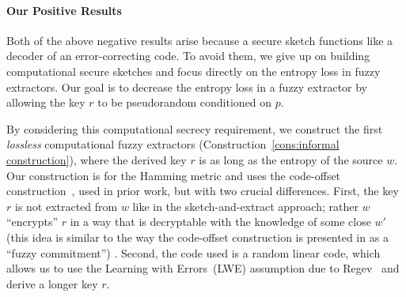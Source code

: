 \documentclass[11pt]{article}
\newcommand{\consref}[1]{\mbox{Construction~\ref{#1}}}
\newcommand{\class}[1]{{\ensuremath{\mathsf{#1}}}}
\newcommand{\rep}{\ensuremath{\class{Rep}}\xspace}
\newcommand{\rec}{\ensuremath{\class{Rec}}\xspace}
\newcommand{\authnote}[2]{{\textcolor{red}{\textsf{#1 notes: }\textcolor{blue}{ #2}}\marginpar{\textcolor{red}{\textbf{!!!!!}}}}}
\newcommand{\authnote}[2]{}
\newcommand{\lnote}[1]{{\authnote{Leo}{#1}}}
\newcommand{\recout}{x}
\begin{document}





\paragraph {Our Positive Results}

Both of the above negative results arise because a secure sketch functions like a decoder of an error-correcting code.  To avoid them, we give up on building computational secure sketches and focus directly on the entropy loss in fuzzy extractors.  Our goal is to decrease the entropy loss in a fuzzy extractor by allowing the key $r$ to be pseudorandom conditioned on $p$.  

By considering this computational secrecy requirement, we construct the first \emph{lossless} computational fuzzy extractors (\consref{cons:informal construction}), where the derived key $r$ is as long as the entropy of the source $w$. Our construction is for the Hamming metric and uses the code-offset construction~\cite{JW99},\cite[Section 5]{DBLP:journals/siamcomp/DodisORS08} used in prior work, but with two crucial differences.  First, the key $r$ is not extracted from $w$ like in the sketch-and-extract approach; rather $w$ ``encrypts'' $r$ in a way that is decryptable with the knowledge of some close $w'$ (this idea is similar to the way the code-offset construction is presented in 
\cite{JW99} as  a ``fuzzy commitment'') . Second, the code used is a random linear code, which allows us to use the Learning with Errors~(LWE) assumption due to Regev~\cite{regev2005LWE, regevLWEsurvey} and derive a longer key $r$.
\end{document}
